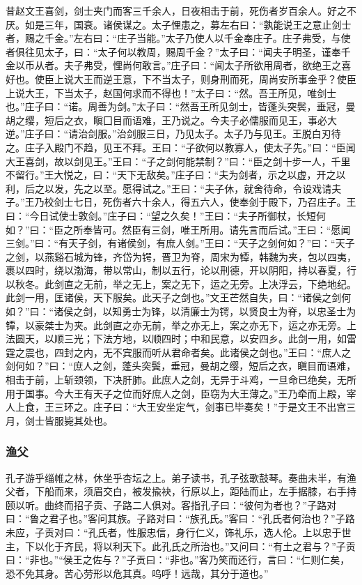 \documentclass[]{article}
\begin{document}
昔赵文王喜剑，剑士夹门而客三千余人，日夜相击于前，死伤者岁百余人。好之不厌。如是三年，国衰。诸侯谋之。太子悝患之，募左右曰：``孰能说王之意止剑士者，赐之千金。''左右曰：``庄子当能。''太子乃使人以千金奉庄子。庄子弗受，与使者俱往见太子，曰：``太子何以教周，赐周千金？''太子曰：``闻夫子明圣，谨奉千金以币从者。夫子弗受，悝尚何敢言。''庄子曰：``闻太子所欲用周者，欲绝王之喜好也。使臣上说大王而逆王意，下不当太子，则身刑而死，周尚安所事金乎？使臣上说大王，下当太子，赵国何求而不得也！''太子曰∶``然。吾王所见，唯剑士也。''庄子曰：``诺。周善为剑。''太子曰：``然吾王所见剑士，皆蓬头突鬓，垂冠，曼胡之缨，短后之衣，瞋囗目而语难，王乃说之。今夫子必儒服而见王，事必大逆。''庄子曰：``请治剑服。''治剑服三日，乃见太子。太子乃与见王。王脱白刃待之。庄子入殿门不趋，见王不拜。王曰：``子欲何以教寡人，使太子先。''曰：``臣闻大王喜剑，故以剑见王。''王曰：``子之剑何能禁制？''曰：``臣之剑十步一人，千里不留行。''王大悦之，曰：``天下无敌矣。''庄子曰：``夫为剑者，示之以虚，开之以利，后之以发，先之以至。愿得试之。''王曰：``夫子休，就舍待命，令设戏请夫子。''王乃校剑士七日，死伤者六十余人，得五六人，使奉剑于殿下，乃召庄子。王曰：``今日试使士敦剑。''庄子曰：``望之久矣！''王曰：``夫子所御杖，长短何如？''曰：``臣之所奉皆可。然臣有三剑，唯王所用。请先言而后试。''王曰：``愿闻三剑。''曰：``有天子剑，有诸侯剑，有庶人剑。''王曰：``天子之剑何如？''曰：``天子之剑，以燕谿石城为锋，齐岱为锷，晋卫为脊，周宋为镡，韩魏为夹，包以四夷，裹以四时，绕以渤海，带以常山，制以五行，论以刑德，开以阴阳，持以春夏，行以秋冬。此剑直之无前，举之无上，案之无下，运之无旁。上决浮云，下绝地纪。此剑一用，匡诸侯，天下服矣。此天子之剑也。''文王芒然自失，曰：``诸侯之剑何如？''曰：``诸侯之剑，以知勇士为锋，以清廉士为锷，以贤良士为脊，以忠圣士为镡，以豪桀士为夹。此剑直之亦无前，举之亦无上，案之亦无下，运之亦无旁。上法圆天，以顺三光；下法方地，以顺四时；中和民意，以安四乡。此剑一用，如雷霆之震也，四封之内，无不宾服而听从君命者矣。此诸侯之剑也。''王曰：``庶人之剑何如？''曰：``庶人之剑，蓬头突鬓，垂冠，曼胡之缨，短后之衣，瞋目而语难，相击于前，上斩颈领，下决肝肺。此庶人之剑，无异于斗鸡，一旦命已绝矣，无所用于国事。今大王有天子之位而好庶人之剑，臣窃为大王薄之。''王乃牵而上殿，宰人上食，王三环之。庄子曰：``大王安坐定气，剑事已毕奏矣！''于是文王不出宫三月，剑士皆服毙其处也。

\hypertarget{header-n490}{%
\subsubsection{渔父}\label{header-n490}}

孔子游乎缁帷之林，休坐乎杏坛之上。弟子读书，孔子弦歌鼓琴。奏曲未半，有渔父者，下船而来，须眉交白，被发揄袂，行原以上，距陆而止，左手据膝，右手持颐以听。曲终而招子贡、子路二人俱对。客指孔子曰：``彼何为者也？''子路对曰：``鲁之君子也。''客问其族。子路对曰：``族孔氏。''客曰：``孔氏者何治也？''子路未应，子贡对曰：``孔氏者，性服忠信，身行仁义，饰礼乐，选人伦。上以忠于世主，下以化于齐民，将以利天下。此孔氏之所治也。''又问曰：``有土之君与？''子贡曰：``非也。''``侯王之佐与？''子贡曰：``非也。''客乃笑而还行，言曰：``仁则仁矣，恐不免其身。苦心劳形以危其真。呜呼！远哉，其分于道也。''
\end{document}
